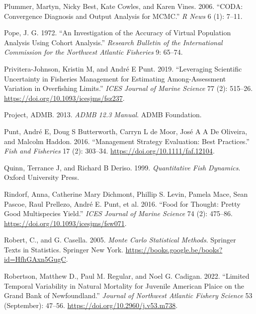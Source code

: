 \documentclass[
]{book}
\newlength{\cslhangindent}
\newlength{\cslentryspacingunit} %
\newenvironment{CSLReferences}[2] %
 {%
  \setlength{\parindent}{0pt}
  \ifodd #1
  \let\oldpar\par
  \def\par{\hangindent=\cslhangindent\oldpar}
  \fi
  \setlength{\parskip}{#2\cslentryspacingunit}
 }%
 {}
\begin{document}
\begin{CSLReferences}{1}{0}
\leavevmode{}%
Plummer, Martyn, Nicky Best, Kate Cowles, and Karen Vines. 2006. {``CODA: Convergence Diagnosis and Output Analysis for MCMC.''} \emph{R News} 6 (1): 7--11.

\leavevmode{}%
Pope, J. G. 1972. {``An Investigation of the Accuracy of Virtual Population Analysis Using Cohort Analysis.''} \emph{Research Bulletin of the International Commission for the Northwest Atlantic Fisheries} 9: 65--74.

\leavevmode{}%
Privitera-Johnson, Kristin M, and André E Punt. 2019. {``Leveraging Scientific Uncertainty in Fisheries Management for Estimating Among-Assessment Variation in Overfishing Limits.''} \emph{ICES Journal of Marine Science} 77 (2): 515--26. \url{https://doi.org/10.1093/icesjms/fsz237}.

\leavevmode{}%
Project, ADMB. 2013. \emph{ADMB 12.3 Manual}. ADMB Foundation.

\leavevmode{}%
Punt, André E, Doug S Butterworth, Carryn L de Moor, José A A De Oliveira, and Malcolm Haddon. 2016. {``Management Strategy Evaluation: Best Practices.''} \emph{Fish and Fisheries} 17 (2): 303--34. \url{https://doi.org/10.1111/faf.12104}.

\leavevmode{}%
Quinn, Terrance J, and Richard B Deriso. 1999. \emph{Quantitative Fish Dynamics}. Oxford University Press.

\leavevmode{}%
Rindorf, Anna, Catherine Mary Dichmont, Phillip S. Levin, Pamela Mace, Sean Pascoe, Raul Prellezo, André E. Punt, et al. 2016. {``Food for Thought: Pretty Good Multispecies Yield.''} \emph{ICES Journal of Marine Science} 74 (2): 475--86. \url{https://doi.org/10.1093/icesjms/fsw071}.

\leavevmode{}%
Robert, C., and G. Casella. 2005. \emph{Monte Carlo Statistical Methods}. Springer Texts in Statistics. Springer New York. \url{https://books.google.be/books?id=HfhGAxn5GugC}.

\leavevmode{}%
Robertson, Matthew D., Paul M. Regular, and Noel G. Cadigan. 2022. {``Limited Temporal Variability in Natural Mortality for Juvenile American Plaice on the Grand Bank of Newfoundland.''} \emph{Journal of Northwest Atlantic Fishery Science} 53 (September): 47--56. \url{https://doi.org/10.2960/j.v53.m738}.


\end{CSLReferences}
\end{document}
